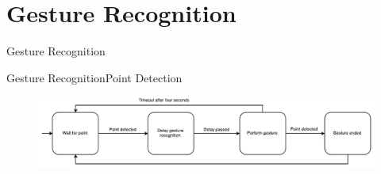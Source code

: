\section{Gesture Recognition}

\begin{frame}{Gesture Recognition}{}
\centering
\begin{figure}
\label{fig:prototype3-gesture-screenshots}
\end{figure}
\end{frame}

\begin{frame}{Gesture Recognition}{Point Detection}
\centering
\begin{figure}
    \includegraphics[width=\textwidth]{../images/point-to-gesture-state-diagram}
\label{fig:point-to-gesture-state-diagram}
\end{figure}
\end{frame}